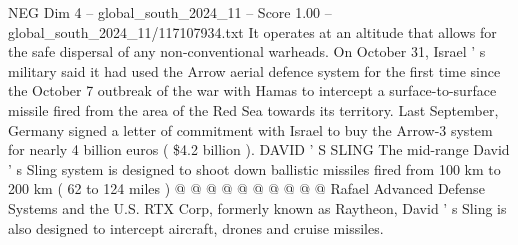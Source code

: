 \begin{textsample}{NEG Dim 4 – global\_south\_2024\_11 – Score 1.00 – global\_south\_2024\_11/117107934.txt}
It operates at an altitude that allows for the safe dispersal of any non-conventional warheads.
On October 31, Israel ' s military said it had used the Arrow aerial defence system for the first time since the October 7 outbreak of the war with Hamas to intercept a surface-to-surface missile fired from the area of the Red Sea towards its territory.
Last September, Germany signed a letter of commitment with Israel to buy the Arrow-3 system for nearly 4 billion euros ( \$4.2 billion ).
DAVID ' S SLING The mid-range David ' s Sling system is designed to shoot down ballistic missiles fired from 100 km to 200 km ( 62 to 124 miles ) @ @ @ @ @ @ @ @ @ @ Rafael Advanced Defense Systems and the U.S.
RTX Corp, formerly known as Raytheon, David ' s Sling is also designed to intercept aircraft, drones and cruise missiles.

\end{textsample}
